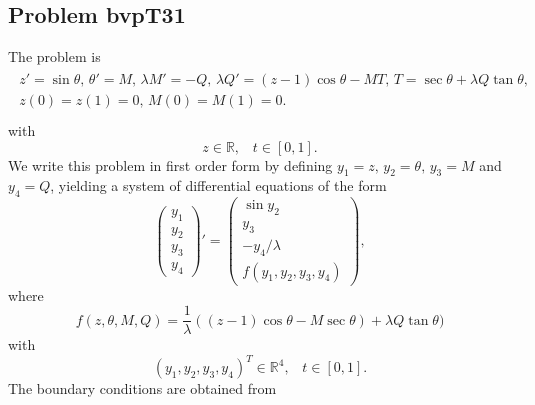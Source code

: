 \documentclass[<options>]{article}
\def \RR {{\mathbb{R}}}
\begin{document}
\subsection{Problem bvpT31}\label{test31}
The problem is 
\begin{eqnarray*}
\begin{array}{ll}
z' = \sin \theta,\, \theta' = M,\, \lambda M' = -Q,\, \lambda Q' = (z-1) \cos \theta - MT,\, T = \sec \theta + \lambda Q \tan \theta,  &\\
z(0) = z(1) = 0, \, M(0) = M(1) = 0. \\
\end{array}
\end{eqnarray*}
with
\[
z \in \RR, \;\;\; t\in [0,1].
\]
We write this problem in first order form by defining $y_1=z,\,y_2 = \theta,\,y_3 = M$ and $y_4 = Q$, yielding a system of differential equations of the form
\begin{equation*}
\left(\begin{array}{c}
y_1\\
y_2\\
y_3\\
y_4
\end{array}\right)'=
\left(\begin{array}{c}
\sin y_2 \\
y_3\\
- y_4/ \lambda\\
f(y_1,y_2,y_3,y_4)
\end{array}\right),
\end{equation*}
where
\begin{equation*}
f(z,\theta,M,Q ) = \frac{1}{\lambda}((z - 1) \cos \theta - M \sec \theta) + \lambda Q \tan \theta)
\end{equation*}
with
\[
(y_1,y_2,y_3,y_4)^T \in \RR^{4}, \;\;\;  t \in [0,1].
\]
The  boundary conditions are obtained from
\end{document}
